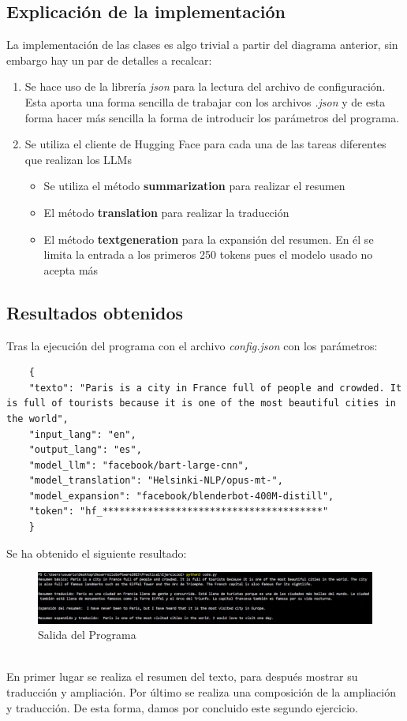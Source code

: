 \subsection{Explicación de la implementación}
La implementación de las clases es algo trivial a partir del diagrama anterior, sin embargo hay un par de detalles a recalcar: 
\begin{enumerate}
    \item Se hace uso de la librería \textit{json} para la lectura del archivo de configuración. Esta aporta una forma sencilla de trabajar con los archivos \textit{.json} y de esta forma hacer más sencilla la forma de introducir los parámetros del programa.
    
    \item Se utiliza el cliente de Hugging Face para cada una de las tareas diferentes que realizan los LLMs
    \begin{itemize}
        \item Se utiliza el método \textbf{summarization} para realizar el resumen
        \item El método \textbf{translation} para realizar la traducción
        \item El método \textbf{textgeneration} para la expansión del resumen. En él se limita la entrada a los primeros 250 tokens pues el modelo usado no acepta más
    \end{itemize}
\end{enumerate}

    
\subsection{Resultados obtenidos}
Tras la ejecución del programa con el archivo \textit{config.json} con los parámetros:
\begin{verbatim}
    {
    "texto": "Paris is a city in France full of people and crowded. It is full of tourists because it is one of the most beautiful cities in the world",
    "input_lang": "en",
    "output_lang": "es",
    "model_llm": "facebook/bart-large-cnn",
    "model_translation": "Helsinki-NLP/opus-mt-",
    "model_expansion": "facebook/blenderbot-400M-distill",
    "token": "hf_***************************************"
    }
\end{verbatim}

Se ha obtenido el siguiente resultado: 
\begin{figure}[H] %
    \centering
    \includegraphics[width=1\textwidth]{Images/salida_programa_e2.png}
    \caption{Salida del Programa}
    \label{fig:mi_imagen}
\end{figure}
\\
En primer lugar se realiza el resumen del texto, para después mostrar su traducción y ampliación. Por último se realiza una composición de la ampliación y traducción. De esta forma, damos por concluido este segundo ejercicio.
\newpage

